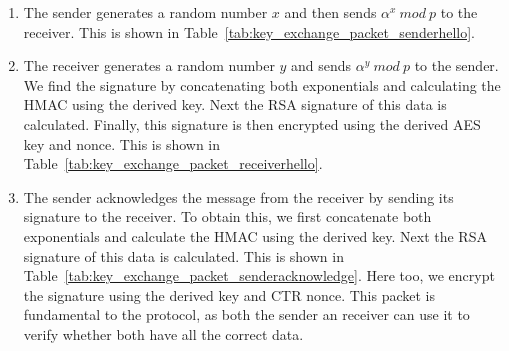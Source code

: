 \documentclass[a4paper]{article}
\begin{document}
\begin{enumerate}
    \item The sender generates a random number $x$ and then sends $\alpha^x\ mod\ p$ to the receiver. This is shown in Table~\ref{tab:key_exchange_packet_senderhello}.
    \item The receiver generates a random number $y$ and sends $\alpha^y\ mod\ p$ to the sender. We find the signature by concatenating both exponentials and calculating the HMAC using the derived key. Next the RSA signature of this data is calculated. Finally, this signature is then encrypted using the derived AES key and nonce. This is shown in Table~\ref{tab:key_exchange_packet_receiverhello}.
    \item The sender acknowledges the message from the receiver by sending its signature to the receiver. To obtain this, we first concatenate both exponentials and calculate the HMAC using the derived key. Next the RSA signature of this data is calculated. This is shown in Table~\ref{tab:key_exchange_packet_senderacknowledge}. Here too, we encrypt the signature using the derived key and CTR nonce. This packet is fundamental to the protocol, as both the sender an receiver can use it to verify whether both have all the correct data.
\end{enumerate}
\end{document}
